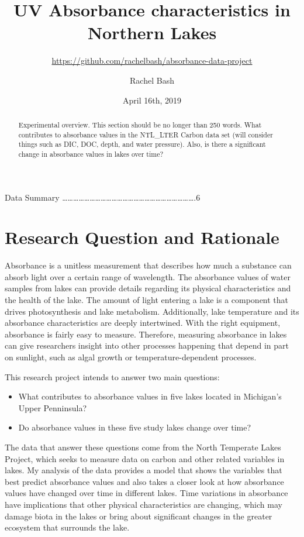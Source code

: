 \documentclass[12pt,]{article}
\title{UV Absorbance characteristics in Northern Lakes}
\subtitle{\url{https://github.com/rachelbash/absorbance-data-project}}
\author{Rachel Bash}
\date{April 16th, 2019}
\providecommand{\tightlist}{%
  \setlength{\itemsep}{0pt}\setlength{\parskip}{0pt}}
\begin{document}
\maketitle
\begin{abstract}
Experimental overview. This section should be no longer than 250 words.
What contributes to absorbance values in the NTL\_LTER Carbon data set
(will consider things such as DIC, DOC, depth, and water pressure).
Also, is there a significant change in absorbance values in lakes over
time?
\end{abstract}

\newpage

\tableofcontents  \newpage
{} Data Summary
\ldots{}\ldots{}\ldots{}\ldots{}\ldots{}\ldots{}\ldots{}\ldots{}\ldots{}\ldots{}\ldots{}\ldots{}\ldots{}\ldots{}\ldots{}\ldots{}\ldots{}\ldots{}\ldots{}\ldots{}\ldots{}\ldots{}\ldots{}\ldots{}.6
\newpage
\listoffigures  \newpage

\section{Research Question and
Rationale}\label{research-question-and-rationale}

Absorbance is a unitless measurement that describes how much a substance
can absorb light over a certain range of wavelength. The absorbance
values of water samples from lakes can provide details regarding its
physical characteristics and the health of the lake. The amount of light
entering a lake is a component that drives photosynthesis and lake
metabolism. Additionally, lake temperature and its absorbance
characteristics are deeply intertwined. With the right equipment,
absorbance is fairly easy to measure. Therefore, measuring absorbance in
lakes can give researchers insight into other processes happening that
depend in part on sunlight, such as algal growth or
temperature-dependent processes.

This research project intends to answer two main questions:

\begin{itemize}
\tightlist
\item
  What contributes to absorbance values in five lakes located in
  Michigan's Upper Penninsula?
\item
  Do absorbance values in these five study lakes change over time?
\end{itemize}

The data that answer these questions come from the North Temperate Lakes
Project, which seeks to measure data on carbon and other related
variables in lakes. My analysis of the data provides a model that shows
the variables that best predict absorbance values and also takes a
closer look at how absorbance values have changed over time in different
lakes. Time variations in absorbance have implications that other
physical characteristics are changing, which may damage biota in the
lakes or bring about significant changes in the greater ecosystem that
surrounds the lake.
\end{document}
